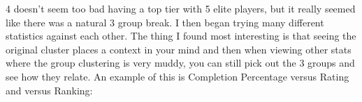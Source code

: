 \documentclass[10pt]{article}
\begin{document}
\hfill
{}%
\par
\par
{}%
\hfill
{}%
\par
4 doesn't seem too bad having a top tier with 5 elite players, but it really seemed like there was a natural 3 group break. I then began trying many different statistics against each other. The thing I found most interesting is that seeing the original cluster places a context in your mind and then when viewing other stats where the group clustering is very muddy, you can still pick out the 3 groups and see how they relate. An example of this is Completion Percentage versus Rating and versus Ranking:
\par
{}%
\end{document}
